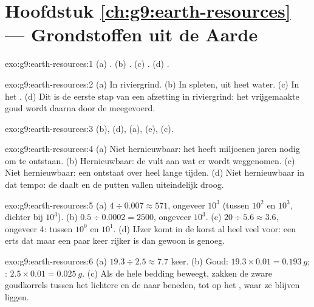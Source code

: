 \section*{Hoofdstuk \ref{ch:g9:earth-resources} --- Grondstoffen uit de Aarde}

\begin{solution}{exo:g9:earth-resources:1}
(a) . (b) . (c) . (d) .
\end{solution}

\begin{solution}{exo:g9:earth-resources:2}
(a) In riviergrind. (b) In spleten, uit heet water. (c) In het .
(d) Dit is de eerste stap van een afzetting in riviergrind: het vrijgemaakte
goud wordt daarna door de  meegevoerd.
\end{solution}

\begin{solution}{exo:g9:earth-resources:3}
(b), (d), (a), (e), (c).
\end{solution}

\begin{solution}{exo:g9:earth-resources:4}
(a) Niet hernieuwbaar: het heeft miljoenen jaren nodig om te ontstaan.
(b) Hernieuwbaar: de  vult aan wat er wordt weggenomen. (c) Niet
hernieuwbaar: een  ontstaat over heel lange tijden. (d) Niet
hernieuwbaar in dat tempo: de  daalt en de putten vallen
uiteindelijk droog.
\end{solution}

\begin{solution}{exo:g9:earth-resources:5}
(a) $4 \div 0.007 \approx 571$, ongeveer $10^3$ (tussen $10^2$ en $10^3$,
dichter bij $10^3$). (b) $0.5 \div 0.0002 = 2500$, ongeveer $10^3$. (c) $20
\div 5.6 \approx 3.6$, ongeveer 4: tussen $10^0$ en $10^1$.
(d) IJzer komt in de korst al heel veel voor: een erts dat maar een paar
keer rijker is dan gewoon  is genoeg.
\end{solution}

\begin{solution}{exo:g9:earth-resources:6}
(a) $19.3 \div 2.5 \approx 7.7$ keer. (b) Goud: $19.3 \times 0.01 =
\qty{0.193}{g}$; : $2.5 \times 0.01 = \qty{0.025}{g}$. (c) Als de
hele bedding beweegt, zakken de zware goudkorrels tussen het lichtere 
en de  naar beneden, tot op het , waar ze blijven
liggen.
\end{solution}

